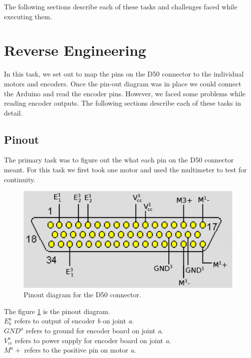 \documentclass[10pt,a4paper]{article}
\begin{document}
The following sections describe each of these tasks and challenges
faced while executing them.

\section{Reverse Engineering}

In this task, we set out to map the pins on the D50 connector to the
individual motors and encoders. Once the pin-out diagram was in place
we could connect the Arduino and read the encoder pins. However, we
faced some problems while reading encoder outputs. The following
sections describe each of these tasks in detail. \\

\subsection{Pinout}
The primary task was to figure out the what each pin on the D50
connector meant. For this task we first took one motor and used the
multimeter to test for continuity. \\

\begin{figure}[h]
    \centering
    \includegraphics[scale=0.3]{dsub50.png}
    \caption{Pinout diagram for the D50 connector.}
    \label{fig:dsub}
\end{figure}

The figure \ref{fig:dsub} is the pinout diagram.\\
\( E^a_b \) refers to output of encoder \textit{b} on joint \textit{a}.\\
\( GND^a \) refers to ground for encoder board on joint \textit{a}.\\
\( V^a_{cc} \) refers to power supply for encoder board on joint
\textit{a}.\\ 
\( M^a+ \) refers to the positive pin on motor \textit{a}.\\
\end{document}
